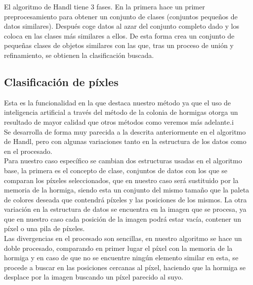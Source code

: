 \documentclass{pid}
\begin{document}
El algoritmo de Handl tiene 3 fases. En la primera hace un primer preprocesamiento para obtener un conjunto de clases (conjuntos pequeños de datos similares). Después coge datos al azar del conjunto completo dado y los coloca en las clases más similares a ellos. De esta forma crea un conjunto de pequeñas clases de objetos similares con las que, tras un proceso de unión y refinamiento, se obtienen la clasificación buscada.\\

\subsection{Clasificación de píxles}
Esta es la funcionalidad en la que destaca nuestro método ya que el uso de inteligencia artificial a través del método de la colonia de hormigas otorga un resultado de mayor calidad que otros métodos como veremos más adelante.i\\

Se desarrolla de forma muy parecida a la descrita anteriormente en el algoritmo de Handl, pero con algunas variaciones tanto en la estructura de los datos como en el procesado. \\

Para nuestro caso específico se cambian dos estructuras usadas en el algoritmo base, la primera es el concepto de clase, conjuntos de datos con los que se comparan los píxeles seleccionados, que en nuestro caso será sustituido por la memoria de la hormiga, siendo esta un conjunto del mismo tamaño que la paleta de colores deseada que contendrá píxeles y las posiciones de los mismos. La otra variación en la estructura de datos se encuentra en la imagen que se procesa, ya que en nuestro caso cada posición de la imagen podrá estar vacía, contener un píxel o una pila de píxeles.\\

Las divergencias en el procesado son sencillas, en nuestro algoritmo se hace un doble procesado, comparando en primer lugar el píxel con la memoria de la hormiga y en caso de que no se encuentre ningún elemento similar en esta, se procede a buscar en las posiciones cercanas al píxel, haciendo que la hormiga se desplace por la imagen buscando un píxel parecido al suyo. \\
\end{document}
